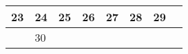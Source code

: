 {\begin{tabularx}{\linewidth}{|l!{\vrule width \myLenLineThicknessThick}*{7}{@{}X@{}|}}
      
      
        \begin{minipage}[t]{6mm}\centering{}23\end{minipage}
      
       & 
    
      
      
        \begin{minipage}[t]{6mm}\centering{}24\end{minipage}
      
       & 
    
      
      
        \begin{minipage}[t]{6mm}\centering{}25\end{minipage}
      
       & 
    
      
      
        \begin{minipage}[t]{6mm}\centering{}26\end{minipage}
      
       & 
    
      
      
        \begin{minipage}[t]{6mm}\centering{}27\end{minipage}
      
       & 
    
      
      
        \begin{minipage}[t]{6mm}\centering{}28\end{minipage}
      
       & 
    
      
      
        \begin{minipage}[t]{6mm}\centering{}29\end{minipage}
      
      
        \\  \hline 
      
    
  
  
  
  \hyperlink{week-2026-48}{} &
    
      
      
        \begin{minipage}[t]{6mm}\centering{}30\end{minipage}
      

\end{tabularx}}

